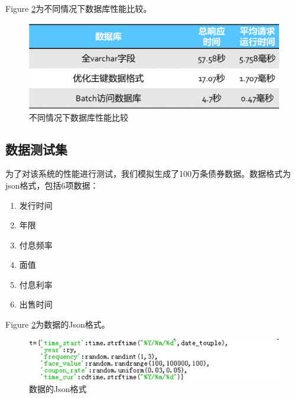 Figure \ref{fig:sys.param}为不同情况下数据库性能比较。
\begin{figure}[H]
\begin{center}
\includegraphics[width=16cm]{img//DB_performance.PNG}
\caption{不同情况下数据库性能比较}
\label{fig:sys.param}
\end{center}
\end{figure}

\subsection{数据测试集}
为了对该系统的性能进行测试，我们模拟生成了100万条债券数据。数据格式为json格式，包括6项数据：
\begin{enumerate}
\item 发行时间
\item 年限
\item 付息频率
\item 面值
\item 付息利率
\item 出售时间
\end{enumerate}

Figure \ref{fig:sys.param}为数据的Json格式。
\begin{figure}[H]
\begin{center}
\includegraphics[width=16cm]{img//test_data.PNG}
\caption{数据的Json格式}
\label{fig:sys.param}
\end{center}
\end{figure}